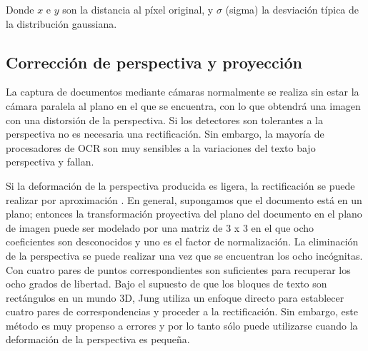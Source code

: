 Donde $x$ e $y$ son la distancia al píxel original, y $\sigma$ (sigma) la desviación típica de la distribución gaussiana. 




\subsection{Corrección de perspectiva y proyección}
La captura de documentos mediante cámaras normalmente se realiza sin estar la cámara paralela al plano en el que se encuentra, con lo que obtendrá una imagen con una distorsión de la perspectiva. 
Si los detectores son tolerantes a la perspectiva no es necesaria una rectificación. Sin embargo, la mayoría de procesadores de \acs{OCR} son muy sensibles a la variaciones del texto bajo perspectiva y fallan.

Si la deformación de la perspectiva producida es ligera, la rectificación se puede realizar por aproximación \cite{Hsieh}. En general, supongamos que el documento está en un plano; entonces la transformación proyectiva del plano del documento en el plano de imagen puede ser modelado por una matriz de 3 x 3 en el que ocho coeficientes son desconocidos y uno es el factor de normalización. La eliminación de la perspectiva se puede realizar una vez que se encuentran los ocho incógnitas. Con cuatro pares de puntos correspondientes son suficientes para recuperar los ocho grados de libertad. Bajo el supuesto de que los bloques de texto son rectángulos en un mundo 3D, Jung \cite{Jung}  utiliza un enfoque directo para establecer cuatro pares de correspondencias y proceder a la rectificación. Sin embargo, este método es muy propenso a errores y por lo tanto sólo puede utilizarse cuando la deformación de la perspectiva es pequeña.

